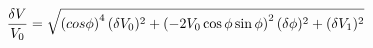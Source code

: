 \begin{equation}
\label{eq:delta_V_Malus}
\frac{\delta V}{V_0} = \sqrt{ \left(\\cos{\phi}\right)^4(\delta V_0)^2 + \left(-2 V_0 \cos{\phi}\sin{\phi} \right)^2(\delta \phi)^2+ (\delta V_1)^2}
\end{equation}